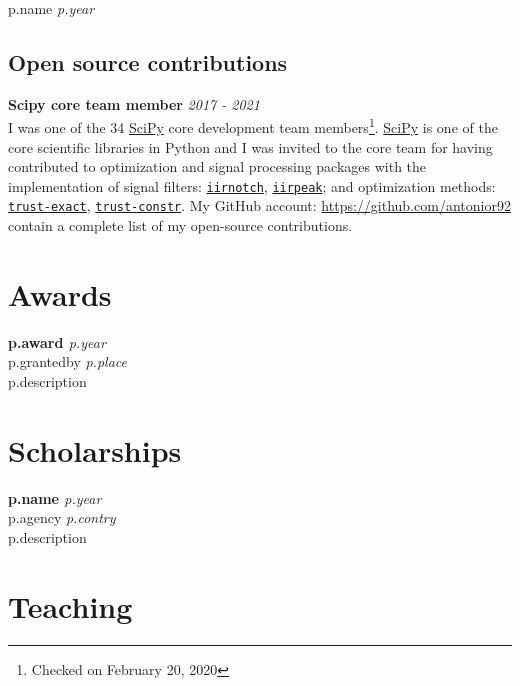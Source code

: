 \documentclass[10pt,letterpaper]{article} %
\begin{document}
{{{{{{{{{{{{{%
        {{ p.name }} \hfill {\em {{ p.year }} }
{%

\subsection*{Open source contributions}

{\bf Scipy  core team member} \hfill {\em 2017 - 2021} \\
I was one of the 34 \href{https://www.scipy.org}{SciPy} core development  team members\footnote{Checked on February 20, 2020}.
\href{https://www.scipy.org}{SciPy} is one of the core scientific libraries in Python and I was invited to the core team
for having contributed to optimization and signal processing packages with the implementation of signal filters:
\href{http://scipy.github.io/devdocs/generated/scipy.signal.iirnotch.html}{\texttt{iirnotch}},
    \href{http://scipy.github.io/devdocs/generated/scipy.signal.iirpeak.html}{\texttt{iirpeak}};
    and optimization methods: \href{http://scipy.github.io/devdocs/optimize.minimize-trustexact.html}{\texttt{trust-exact}}, \href{http://scipy.github.io/devdocs/optimize.minimize-trustconstr.html}{\texttt{trust-constr}}. My GitHub account: \href{https://github.com/antonior92}{https://github.com/antonior92} contain a complete list of my open-source contributions.

\section*{Awards}

{%
{\bf {{ p.award }}} \hfill {\em {{ p.year }} }\\
{ {{ p.grantedby }} } \hfill  {\em {{p.place}} } \\
    {{ p.description }}
{%

\section*{Scholarships}

{%
{\bf {{ p.name }}} \hfill {\em {{ p.year }} } \\
{ {{ p.agency }} } \hfill  {\em {{p.contry}} } \\
    {{ p.description }}
{%

\section*{Teaching}

}}}}}}}}}}}}}}}}}}
\end{document}
